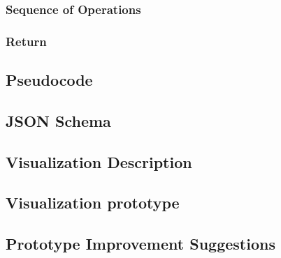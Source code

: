 \documentclass{article}
\begin{document}
\subsubsection{Sequence of Operations}
\subsubsection{Return}
\subsection{Pseudocode}
\subsection{JSON Schema}
\subsection{Visualization Description}
\subsection{Visualization prototype}
\subsection{Prototype Improvement Suggestions}
\end{document}
